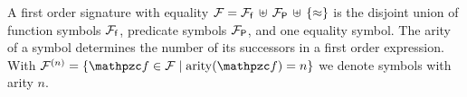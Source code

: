 
\begin{definition}\label{def:signature}
A 
first order 
{\myem signature} with equality
${\mathcal F} = {{\mathcal F}_{\mathsf f}}\,\uplus\,{{\mathcal F}_{\mathsf P}}\,\uplus\,\{\approx\}$ 
is the disjoint union of 
{\myem function symbols} ${{\mathcal F}_{\mathsf f}}$, 
{\myem predicate symbols} ${{\mathcal F}_{\mathsf P}}$,
and one equality symbol.
%
The {\myem arity} of a symbol determines the number of its successors in a first order expression.
With $\mcFn = \{ \mcf\in\mcF \mid \arity(\mcf) = n \}$ we denote symbols with arity $n$.
\end{definition}
